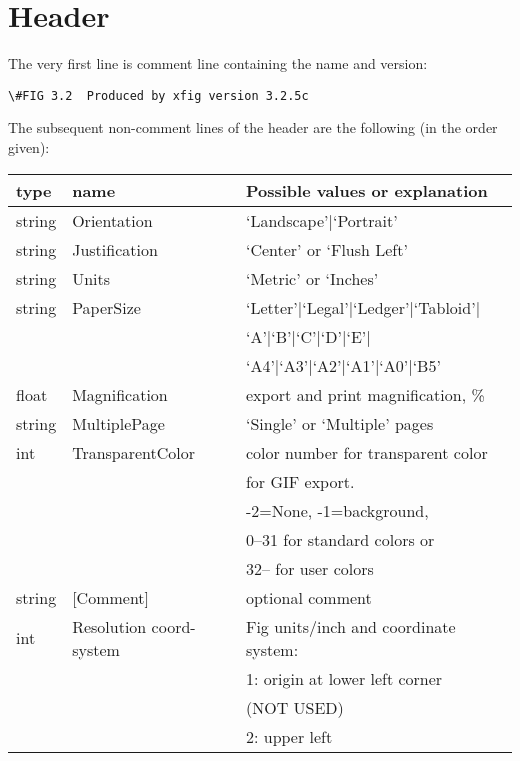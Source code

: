 \documentclass[10pt, a4paper]{article}
\begin{document}
\section{Header}\label{sec:header}

The very first line is comment line containing the name and version: 
%
\begin{verbatim}
\#FIG 3.2  Produced by xfig version 3.2.5c 
\end{verbatim}


The subsequent non-comment lines of the header are the following 
(in the order given): \\
%
\begin{tabular}{lll}
\toprule
type & name & Possible values or explanation \\
\midrule
\midrule
string & Orientation             & `Landscape'|`Portrait' \\
string & Justification           & `Center' or `Flush Left' \\
string & Units                   & `Metric' or `Inches' \\
string & PaperSize               & `Letter'|`Legal'|`Ledger'|`Tabloid'|\\
&&                                 `A'|`B'|`C'|`D'|`E'|\\
&&                                 `A4'|`A3'|`A2'|`A1'|`A0'|`B5' \\
float  & Magnification           & export and print magnification, \% \\
string & MultiplePage           & `Single' or `Multiple' pages \\
int    & TransparentColor       & color number for transparent color \\
&&                                 for GIF export. \\
&&                                -2=None, -1=background, \\
&&                                0--31 for standard colors or \\
&&                                32-- for user colors \\
string & [Comment]              & optional comment \\%
int    & Resolution coord-system & Fig units/inch and coordinate system:\\
&&                                 1: origin at lower left corner \\
&&                                    (NOT USED)\\
&&                                 2: upper left \\
\bottomrule
\end{tabular}
\end{document}
